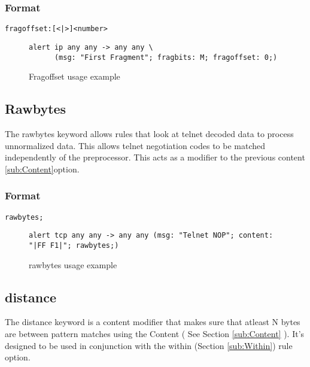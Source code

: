 \documentclass[english]{report}
\begin{document}
\subsubsection{Format}

\begin{verbatim}
fragoffset:[<|>]<number>
\end{verbatim}

%
\begin{figure}[!hbpt]
\begin{verbatim}
alert ip any any -> any any \
      (msg: "First Fragment"; fragbits: M; fragoffset: 0;)
\end{verbatim}

\caption{Fragoffset usage example \label{fragoffset usage example}}
\end{figure}

\subsection{Rawbytes \label{sub:Rawbytes}}

The rawbytes keyword allows rules that look at telnet decoded data
to process unnormalized data. This allows telnet negotiation codes
to be matched independently of the preprocessor. This acts as a modifier
to the previous content \ref{sub:Content}option. 

\subsubsection{Format}

\begin{verbatim}
rawbytes;
\end{verbatim}
%
\begin{figure}[!hbpt]
\begin{verbatim}
alert tcp any any -> any any (msg: "Telnet NOP"; content: "|FF F1|"; rawbytes;)
\end{verbatim}
\caption{rawbytes usage example \label{rawbytes usage example}}
\end{figure}


\subsection{distance\label{sub:Distance}}

The distance keyword is a content modifier that makes sure that
atleast N bytes are between pattern matches using the Content ( See
Section \ref{sub:Content} ).  It's designed to be used in conjunction
with the within (Section \ref{sub:Within}) rule option.
\end{document}
